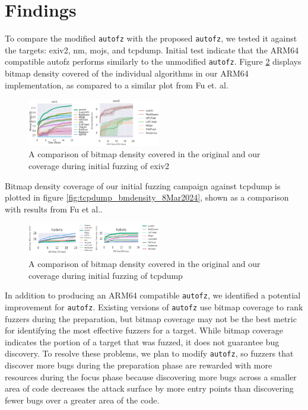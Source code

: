 \section{Findings}

To compare the  modified \texttt{autofz} with the proposed \texttt{autofz}, we tested it against the 
targets: exiv2, nm, mojs, and tcpdump. Initial test indicate that the ARM64 compatible 
autofz performs similarly to the unmodified \texttt{autofz}. Figure \ref{fig:exiv2_compare_orig_arm64} 
displays bitmap density covered of the individual algorithms in our ARM64 implementation, 
as compared to a similar plot from Fu et. al\cite{fu_autofz_2023}.

\begin{figure}
    \includegraphics[width=0.52\textwidth]{figs/exiv2_compare_orig_arm64.png}
    \centering
    \caption{A comparison of bitmap density covered in the original\cite{fu_autofz_2023} and our 
    coverage during initial fuzzing of exiv2}
    \label{fig:exiv2_compare_orig_arm64}
\end{figure}

Bitmap density coverage of our initial fuzzing campaign against tcpdump is plotted 
in figure \ref{fig:tcpdump_bmdensity_8Mar2024}, shown as a comparison with results 
from Fu et al.\cite{fu_autofz_2023}.

\begin{figure}
    \includegraphics[width=0.52\textwidth]{figs/tcp_compare_orig_arm64.png}
    \centering
    \caption{A comparison of bitmap density covered in the original\cite{fu_autofz_2023} and our 
    coverage during initial fuzzing of tcpdump}
    \label{fig:exiv2_compare_orig_arm64}
\end{figure}

In addition to producing an ARM64 compatible \texttt{autofz}, we identified a potential improvement for \texttt{autofz}.
Existing versions of \texttt{autofz} use bitmap coverage to rank fuzzers during the preparation, but bitmap
coverage may not be the best metric for identifying the most effective fuzzers for a target. While
bitmap coverage indicates the portion of a target that was fuzzed, it does not guarantee bug discovery.
To resolve these problems, we plan to modify \texttt{autofz}, so fuzzers that discover more bugs during the
preparation phase are rewarded with more resources during the focus phase because discovering more bugs
across a smaller area of code decreases the attack surface by more entry points than discovering fewer
bugs over a greater area of the code.